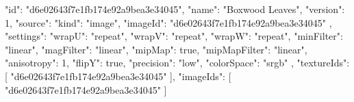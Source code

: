 {
  "id": "d6e02643f7e1fb174e92a9bea3e34045",
  "name": "Boxwood Leaves",
  "version": 1,
  "source": {
    "kind": "image",
    "imageId": "d6e02643f7e1fb174e92a9bea3e34045"
  },
  "settings": {
    "wrapU": "repeat",
    "wrapV": "repeat",
    "wrapW": "repeat",
    "minFilter": "linear",
    "magFilter": "linear",
    "mipMap": true,
    "mipMapFilter": "linear",
    "anisotropy": 1,
    "flipY": true,
    "precision": "low",
    "colorSpace": "srgb"
  },
  "textureIds": [
    "d6e02643f7e1fb174e92a9bea3e34045"
  ],
  "imageIds": [
    "d6e02643f7e1fb174e92a9bea3e34045"
  ]
}
